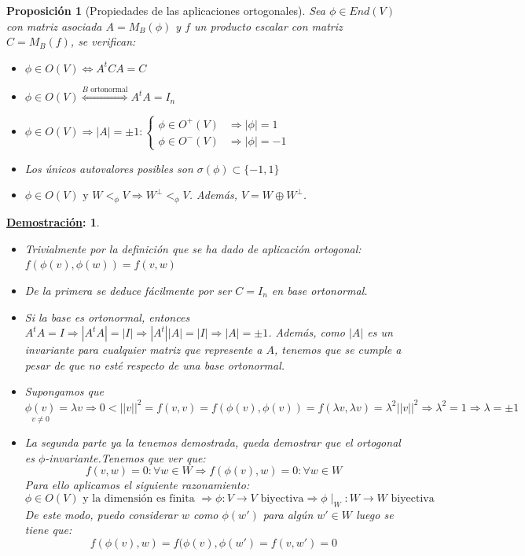 \documentclass[10pt,a4paper,openright]{book}
\theoremstyle{break}
\newtheorem*{prop}{Proposición}
\newtheorem*{demo}{\underline{Demostración}:}
\begin{document}
\begin{prop}[Propiedades de las aplicaciones ortogonales]
Sea $\phi\in End(V)$ con matriz asociada $A = M_B(\phi)$ y $f$ un producto escalar con matriz $C = M_B(f)$, se verifican:
\begin{itemize}
\item $\phi\in O(V)\Leftrightarrow A^t C A = C $

\item $\phi\in O(V) \stackrel{B\mbox{ ortonormal}}{\Leftrightarrow} A^t A = I_n$

\item $\phi \in O(V)\Rightarrow |A| = \pm 1: \begin{cases} \phi \in O^+(V) & \Rightarrow |\phi| = 1 \\ \phi \in O^-(V) & \Rightarrow |\phi| = -1\end{cases}$

\item Los únicos autovalores posibles son $\sigma(\phi) \subset \{-1, 1\}$

\item $\phi\in O(V) \mbox{ y } W<_\phi V \Rightarrow W^\perp <_\phi V$. Además, $V = W \oplus W^\perp$.
\end{itemize}
\end{prop}
\begin{demo}
\begin{itemize}
\item Trivialmente por la definición que se ha dado de aplicación ortogonal: $f(\phi(v),\phi(w)) = f(v,w)$
\item De la primera se deduce fácilmente por ser $C=I_n$ en base ortonormal.
\item Si la base es ortonormal, entonces $A^tA = I\Rightarrow |A^tA| = |I|\Rightarrow |A^t||A| = |I|\Rightarrow |A| = \pm 1$. Además, como $|A|$ es un invariante para cualquier matriz que represente a $A$, tenemos que se cumple a pesar de que no esté respecto de una base ortonormal.
\item Supongamos que $\underset{v \neq 0}{\phi(v)} = \lambda v \Rightarrow 0<||v||^2 = f(v,v)  = f(\phi(v),\phi(v)) = f(\lambda v, \lambda v) = \lambda ^2 ||v||^2 \Rightarrow \lambda^2 = 1 \Rightarrow \lambda = \pm 1$
\item La segunda parte ya la tenemos demostrada, queda demostrar que el ortogonal es $\phi$-invariante.Tenemos que ver que:
$$f(v,w) = 0 : \forall w \in W \Rightarrow f(\phi(v), w) = 0: \forall w \in W$$
Para ello aplicamos el siguiente razonamiento:
$$\phi \in O(V) \mbox{ y la dimensión es finita }\Rightarrow \phi:V\to V \mbox{ biyectiva} \Rightarrow \phi \mid_W: W\to W \mbox{ biyectiva}$$
De este modo, puedo considerar $w$ como $\phi(w')$ para algún $w'\in W$ luego se tiene que:
$$f(\phi(v), w) = f(\phi(v),\phi(w') = f(v,w') = 0$$
\end{itemize}
\end{demo}
\end{document}
